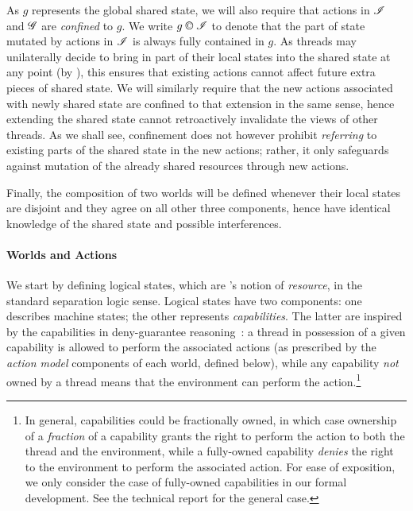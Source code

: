 As $g$ represents the global shared state, we will also require that
actions in $\mathscr{I}$ and $\mathscr{G}$ are \emph{confined} to $g$.  We write
$g \containI \lmod$ to denote that the part of state mutated by
actions in $\mathscr{I}$ is always fully contained in $g$. As threads may
unilaterally decide to bring in part of their local states into the
shared state at any point (by \extendRule), this ensures that
existing actions cannot affect future extra pieces of shared state. We
will similarly require that the new actions associated with newly
shared state are confined to that extension in the same sense, hence
extending the shared state cannot retroactively invalidate the views
of other threads. As we shall see, confinement does not however
prohibit \emph{referring} to existing parts of the shared state in the
new actions; rather, it only safeguards against mutation of the
already shared resources through new actions.

Finally, the composition of two worlds will be defined whenever their
local states are disjoint and they agree on all other three
components, hence have identical knowledge of the shared state and
possible interferences.

\paragraph{Worlds and Actions}
We start by defining logical states, which are \colosl's notion of
\emph{resource}, in the standard separation logic sense. Logical
states have two components: one describes machine states; the other
represents \emph{capabilities}. The latter are inspired by the
capabilities in deny-guarantee reasoning~\cite{dg}: a thread in
possession of a given capability is allowed to perform the associated
actions (as prescribed by the \emph{action model} components of each
world, defined below), while any capability \emph{not} owned by a
thread means that the environment can perform the action.\footnote{In
  general, capabilities could be fractionally owned, in which case
  ownership of a \emph{fraction} of a capability grants the right to
  perform the action to both the thread and the environment, while a
  fully-owned capability \emph{denies} the right to the environment to
  perform the associated action. For ease of exposition, we only
  consider the case of fully-owned capabilities in our formal
  development. See the technical report for the general case.}

